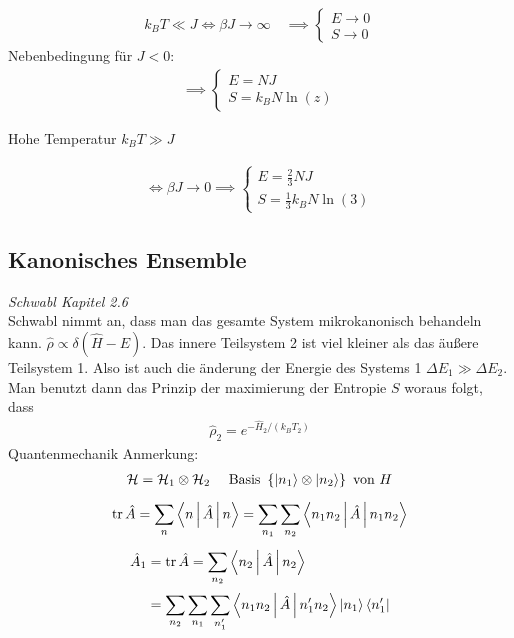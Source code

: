 \documentclass[11pt]{article}
\theoremstyle{plain}
\newcommand{\trace}{\operatorname{tr}}
\begin{document}
\begin{description}
\begin{align*}
      k_B T \ll J \iff \beta J \longrightarrow \infty \quad \implies \begin{cases}
        E \longrightarrow 0 \\ S \longrightarrow 0
      \end{cases}
    \end{align*}
    Nebenbedingung f\"ur $J < 0$: 
    \begin{align*}
      \implies  \begin{cases}
        E = N J \\
        S = k_B N \ln{(z)}
      \end{cases}
    \end{align*}

    Hohe Temperatur $k_B T \gg J$

    \begin{align*}
      \iff \beta J \longrightarrow  0 \implies 
      \begin{cases}
        E = \frac{2}{3} N J \\
        S = \frac{1}{3} k_B N \ln{(3)}
      \end{cases}
    \end{align*}
\end{description}
\subsection*{Kanonisches Ensemble}
\emph{Schwabl Kapitel 2.6} \\
Schwabl nimmt an, dass man das gesamte System mikrokanonisch behandeln kann.
$\hat{\rho} \propto \delta (\hat{H} -E)$. Das innere Teilsystem 2 ist
viel kleiner als das \"au\ss{}ere Teilsystem 1. Also ist auch die \"anderung
der Energie des Systems 1 $\Delta E_1 \gg \Delta E_2$. Man benutzt dann
das Prinzip der maximierung der Entropie $S$ woraus folgt, dass
%
\begin{align*}
  \hat{\rho}_2 = e^{- \hat{H}_2 / (k_B T_2) }
\end{align*}
%
Quantenmechanik Anmerkung:
%
\begin{align*}
  \mathcal{H} = \mathcal{H}_1 \otimes \mathcal{ H}_2 && \text{ Basis } 
  \left\{ \Ket{n_1} \otimes \Ket{n_2} \right\} \text{ von } H
\end{align*}
%
\begin{align*}
  \trace \hat{A} = \sum_{n}^{} \Braket{n | \hat{ A} | n} = 
  \sum_{n_1}^{} \sum_{n_2}^{} \Braket{n_1 n_2 | \hat{A} | n_1 n_2} 
\end{align*}
%
%
\begin{align*}
  \hat{A}_1 & = \trace \hat{A} = \sum_{n_2}^{} \Braket{n_2 | \hat{A} | n_2} \\
            & = \sum_{n_2}^{} \sum_{n_1}^{} \sum_{n_1'}^{} 
  \Braket{ n_1 n_2 | \hat{A} | n_1' n_2} \Ket{n_1} \Bra{n_1'}
\end{align*}
%
\end{document}
